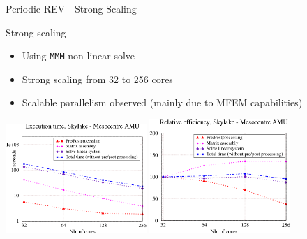 \documentclass{beamer}
\newcommand{\mmm}{\texttt{MMM}}
\begin{document}
\begin{frame}{Periodic
    REV - Strong Scaling}
  \begin{block}{Strong
      scaling}
    \begin{itemize}
      \item Using \mmm{} non-linear solve
      \item Strong scaling from 32 to 256 cores
      \item Scalable parallelism observed (mainly due to MFEM capabilities)
    \end{itemize}
  \end{block}
  \begin{block}{}
    \includegraphics[width=0.4\textwidth]{img/bench_3.png}
    \includegraphics[width=0.4\textwidth]{img/bench_4.png}
  \end{block}
\end{frame}
\end{document}
